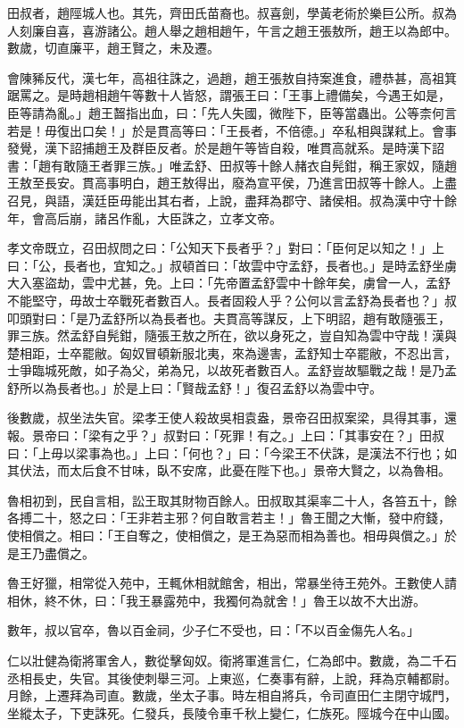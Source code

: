 
\begin{pinyinscope}
田叔者，趙陘城人也。其先，齊田氏苗裔也。叔喜劍，學黃老術於樂巨公所。叔為人刻廉自喜，喜游諸公。趙人舉之趙相趙午，午言之趙王張敖所，趙王以為郎中。數歲，切直廉平，趙王賢之，未及遷。

會陳豨反代，漢七年，高祖往誅之，過趙，趙王張敖自持案進食，禮恭甚，高祖箕踞罵之。是時趙相趙午等數十人皆怒，謂張王曰：「王事上禮備矣，今遇王如是，臣等請為亂。」趙王齧指出血，曰：「先人失國，微陛下，臣等當蟲出。公等柰何言若是！毋復出口矣！」於是貫高等曰：「王長者，不倍德。」卒私相與謀弒上。會事發覺，漢下詔捕趙王及群臣反者。於是趙午等皆自殺，唯貫高就系。是時漢下詔書：「趙有敢隨王者罪三族。」唯孟舒、田叔等十餘人赭衣自髡鉗，稱王家奴，隨趙王敖至長安。貫高事明白，趙王敖得出，廢為宣平侯，乃進言田叔等十餘人。上盡召見，與語，漢廷臣毋能出其右者，上說，盡拜為郡守、諸侯相。叔為漢中守十餘年，會高后崩，諸呂作亂，大臣誅之，立孝文帝。

孝文帝既立，召田叔問之曰：「公知天下長者乎？」對曰：「臣何足以知之！」上曰：「公，長者也，宜知之。」叔頓首曰：「故雲中守孟舒，長者也。」是時孟舒坐虜大入塞盜劫，雲中尤甚，免。上曰：「先帝置孟舒雲中十餘年矣，虜曾一人，孟舒不能堅守，毋故士卒戰死者數百人。長者固殺人乎？公何以言孟舒為長者也？」叔叩頭對曰：「是乃孟舒所以為長者也。夫貫高等謀反，上下明詔，趙有敢隨張王，罪三族。然孟舒自髡鉗，隨張王敖之所在，欲以身死之，豈自知為雲中守哉！漢與楚相距，士卒罷敝。匈奴冒頓新服北夷，來為邊害，孟舒知士卒罷敝，不忍出言，士爭臨城死敵，如子為父，弟為兄，以故死者數百人。孟舒豈故驅戰之哉！是乃孟舒所以為長者也。」於是上曰：「賢哉孟舒！」復召孟舒以為雲中守。

後數歲，叔坐法失官。梁孝王使人殺故吳相袁盎，景帝召田叔案梁，具得其事，還報。景帝曰：「梁有之乎？」叔對曰：「死罪！有之。」上曰：「其事安在？」田叔曰：「上毋以梁事為也。」上曰：「何也？」曰：「今梁王不伏誅，是漢法不行也；如其伏法，而太后食不甘味，臥不安席，此憂在陛下也。」景帝大賢之，以為魯相。

魯相初到，民自言相，訟王取其財物百餘人。田叔取其渠率二十人，各笞五十，餘各搏二十，怒之曰：「王非若主邪？何自敢言若主！」魯王聞之大慚，發中府錢，使相償之。相曰：「王自奪之，使相償之，是王為惡而相為善也。相毋與償之。」於是王乃盡償之。

魯王好獵，相常從入苑中，王輒休相就館舍，相出，常暴坐待王苑外。王數使人請相休，終不休，曰：「我王暴露苑中，我獨何為就舍！」魯王以故不大出游。

數年，叔以官卒，魯以百金祠，少子仁不受也，曰：「不以百金傷先人名。」

仁以壯健為衛將軍舍人，數從擊匈奴。衛將軍進言仁，仁為郎中。數歲，為二千石丞相長史，失官。其後使刺舉三河。上東巡，仁奏事有辭，上說，拜為京輔都尉。月餘，上遷拜為司直。數歲，坐太子事。時左相自將兵，令司直田仁主閉守城門，坐縱太子，下吏誅死。仁發兵，長陵令車千秋上變仁，仁族死。陘城今在中山國。


\end{pinyinscope}
